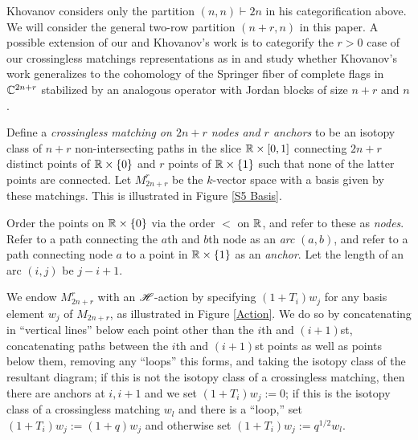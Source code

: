\documentclass{amsart}
\begin{document}
  \begin{remark}
    Khovanov considers only the partition $(n,n) \vdash 2n$ in his categorification above.
    We will consider the general two-row partition $(n+r,n)$ in this paper.
    A possible extension of our and Khovanov's work is to categorify the $r > 0$ case of our crossingless matchings representations as in \cite{Khovanov-tangle} and study whether Khovanov's work generalizes to the cohomology of the Springer fiber of complete flags in $\mathbb{C}^{2n + r}$ stabilized by an analogous operator with Jordan blocks of size $n+r$ and $n$.
  \end{remark}

  \begin{definition}
    Define a \emph{crossingless matching on $2n + r$ nodes and $r$ anchors} to be an isotopy class of $n + r$ non-intersecting paths in the slice $\mathbb{R} \times \left[ 0,1 \right]$ connecting $2n + r$ distinct points of $\mathbb{R} \times \left\{ 0 \right\}$ and $r$ points of $\mathbb{R} \times \left\{ 1 \right\}$ such that none of the latter points are connected. 
  Let $M_{2n + r}^r$ be the $k$-vector space with a basis given by these matchings.
  This is illustrated in Figure \ref{S5 Basis}.
 
  Order the points on $\mathbb{R} \times \left\{ 0 \right\}$ via the order $<$ on $\mathbb{R}$, and refer to these as \emph{nodes}.
  Refer to a path connecting the $a$th and $b$th node as an \emph{arc} $(a,b)$, and refer to a path connecting node $a$ to a point in $\mathbb{R} \times \left\{ 1 \right\}$ as an \emph{anchor}.
  Let the length of an arc $(i,j)$ be $j - i + 1$.


  We endow $M_{2n + r}^r$ with an $\mathscr{H}$-action by specifying $(1 + T_i)w_j$ for any basis element $w_j$ of $M_{2n + r}$, as illustrated in Figure \ref{Action}.
  We do so by concatenating in ``vertical lines'' below each point other than the $i$th and $(i+1)$st, concatenating paths between the $i$th and $(i+1)$st points as well as points below them, removing any ``loops'' this forms, and taking the isotopy class of the resultant diagram;
  if this is not the isotopy class of a crossingless matching, then there are anchors at $i,i+1$ and we set $(1 + T_i)w_j := 0$;
  if this is the isotopy class of a crossingless matching $w_l$ and there is a ``loop,'' set $(1 + T_i)w_j := (1 + q)w_j$ and otherwise set $(1 + T_i)w_j := q^{1/2}w_l$.
  
  \end{definition}
\end{document}
